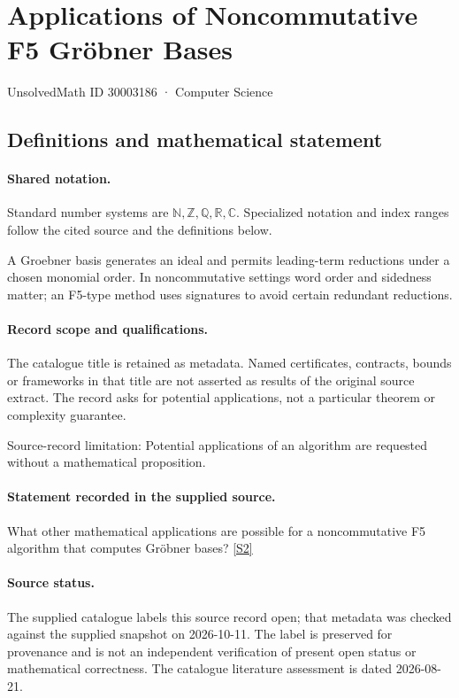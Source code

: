 \documentclass[11pt]{article}
\newcommand{\sref}[2]{\hyperlink{source:#1:#2}{[S#2]}}
\begin{document}
\setcounter{section}{30003185}
\section{Applications of Noncommutative F5 Gröbner Bases}\label{30003186}
{\small\sffamily UnsolvedMath ID 30003186 · Computer Science}
\subsection{Definitions and mathematical statement}

\paragraph{Shared notation.}Standard number systems are $\mathbb N,\mathbb Z,\mathbb Q,\mathbb R,\mathbb C$. Specialized notation and index ranges follow the cited source and the definitions below.


A Groebner basis generates an ideal and permits leading-term reductions under a chosen monomial order. In noncommutative settings word order and sidedness matter; an F5-type method uses signatures to avoid certain redundant reductions.
\paragraph{Record scope and qualifications.}
The catalogue title is retained as metadata. Named certificates, contracts, bounds or frameworks in that title are not asserted as results of the original source extract.
The record asks for potential applications, not a particular theorem or complexity guarantee.

Source-record limitation: Potential applications of an algorithm are requested without a mathematical proposition.
\paragraph{Statement recorded in the supplied source.}
What other mathematical applications are possible for a noncommutative F5 algorithm that computes Gröbner bases? \sref{30003186}{2}
\paragraph{Source status.}
The supplied catalogue labels this source record open; that metadata was checked against the supplied snapshot on 2026-10-11. The label is preserved for provenance and is not an independent verification of present open status or mathematical correctness. The catalogue literature assessment is dated 2026-08-21.
\end{document}
